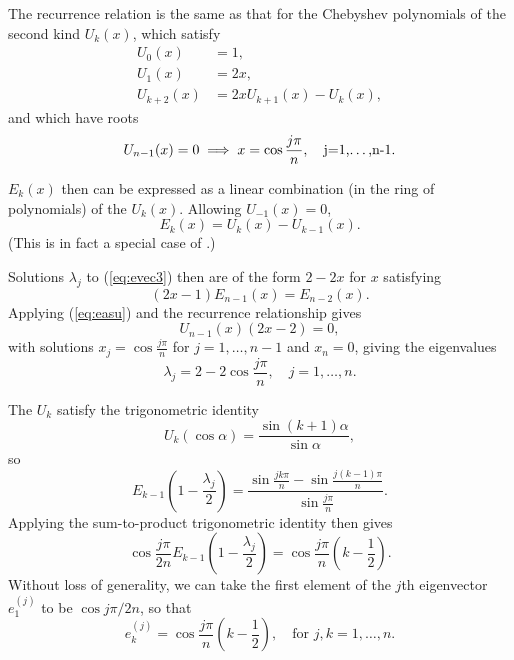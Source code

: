 \documentclass[parskip=half]{scrartcl}
\begin{document}
The recurrence relation is the same as that for the Chebyshev polynomials of
the second kind $U_k(x)$, which satisfy
\begin{align*}
    U_0(x) &= 1,\\
    U_1(x) &= 2x,\\
    U_{k+2}(x) &= 2x U_{k+1}(x) - U_k(x),
\end{align*}
and which have roots
\[
    U_{n-1}(x) = 0 \implies x = \cos \frac{j\pi}{n}, \quad\text{j=1,\dots,n-1}.
\]

$E_k(x)$ then can be expressed as a linear combination (in the ring
of polynomials) of the $U_k(x)$. Allowing $U_{-1}(x)=0$,
\begin{equation}
    \label{eq:easu}
    E_k(x) = U_k(x)-U_{k-1}(x).
\end{equation}
(This is in fact a special case of \cite[Theorem 4.1]{aharonov2005}.)

Solutions $\lambda_j$ to (\ref{eq:evec3}) then are of the form $2-2x$
for $x$ satisfying
\[
    (2x-1)E_{n-1}(x)=E_{n-2}(x).
\]
Applying (\ref{eq:easu}) and the recurrence relationship gives
\[
    U_{n-1}(x)(2x-2) = 0,
\]
with solutions $x_j = \cos \frac{j\pi}{n}$ for $j=1,\dots,n-1$ and
$x_n = 0$, giving the eigenvalues
\[
    \lambda_j = 2 - 2 \cos \frac{j\pi}{n}, \quad j=1,\dots, n.
\]

The $U_k$ satisfy the trigonometric identity
\[
    U_k(\cos \alpha) = \frac{\sin (k+1)\alpha}{\sin \alpha},
\]
so
\[
    E_{k-1}(1-\frac{\lambda_j}{2})
    = \frac{\sin \frac{jk\pi}{n} - \sin \frac{j(k-1)\pi}{n}}{\sin \frac{j\pi}{n}}.
\]
Applying the sum-to-product trigonometric identity then gives
\[
    \cos \frac{j\pi}{2n} E_{k-1}(1-\frac{\lambda_j}{2}) =
    \cos \frac{j\pi}{n}(k-\frac{1}{2}).
\]
Without loss of generality, we can take the first element of the
$j$th eigenvector $e^{(j)}_1$ to be $\cos j\pi/2n$, so that
\[
    e^{(j)}_k = \cos \frac{j\pi}{n}(k-\frac{1}{2}),\quad\text{for $j,k=1,\dots,n$}.
\]

\printbibliography
\end{document}
